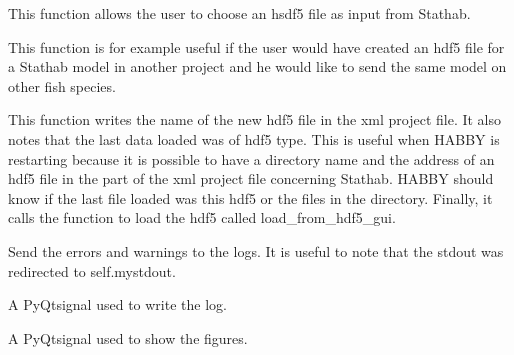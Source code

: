 \documentclass[letterpaper,10pt,english]{sphinxmanual}
\begin{document}
\begin{fulllineitems}
\begin{fulllineitems}
\end{fulllineitems}


\begin{fulllineitems}
\label{\detokenize{index:src_GUI.stathab_GUI.StathabW.select_hdf5}}
This function allows the user to choose an hsdf5 file as input from Stathab.


This function is for example useful if the user would have created an hdf5 file for a Stathab model in another
project and he would like to send the same model on other fish species.

This function writes the name of the new hdf5 file in the xml project file. It also notes that the last data
loaded was of hdf5 type. This is useful when HABBY is restarting because it is possible to have a
directory name and the address of an hdf5 file in the part of the xml project file concerning Stathab.
HABBY should know if the last file loaded was this hdf5 or the files in the directory.
Finally, it calls the function to load the hdf5 called load\_from\_hdf5\_gui.

\end{fulllineitems}


\begin{fulllineitems}
\label{\detokenize{index:src_GUI.stathab_GUI.StathabW.send_err_log}}
Send the errors and warnings to the logs. It is useful to note that the stdout was redirected to self.mystdout.

\end{fulllineitems}


\begin{fulllineitems}
\label{\detokenize{index:src_GUI.stathab_GUI.StathabW.send_log}}
A PyQtsignal used to write the log.

\end{fulllineitems}


\begin{fulllineitems}
\label{\detokenize{index:src_GUI.stathab_GUI.StathabW.show_fig}}
A PyQtsignal used to show the figures.

\end{fulllineitems}


\end{fulllineitems}
\end{document}
